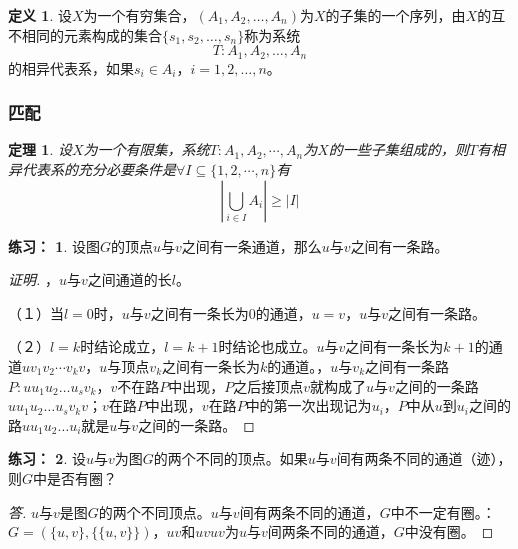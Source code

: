 \documentclass{beamer}
\newtheorem{Thm}{定理}[section]
\theoremstyle{definition}
\newtheorem{Def}{定义}[section]
\theoremstyle{example}
\newtheorem*{Exercise}{练习：}
\begin{document}
\begin{CJK}{UTF8}{gbsn}
\begin{frame}
  \begin{Def}
    设$X$为一个有穷集合，$(A_1,A_2,\ldots,A_n)$为$X$的子集的一个序列，由$X$的互不相同的元素构成的集合$\{s_1,s_2,\ldots,s_n\}$称为系统\[T:A_1,A_2,\ldots,A_n\]的\alert{相异代表系}，如果$s_i\in A_i$，$i=1,2,\ldots,n$。
  \end{Def}

\end{frame}
\begin{frame}
  \frametitle{匹配}
    \begin{Thm}
    设$X$为一个有限集，系统$T:A_1,A_2,\cdots,A_n$为$X$的一些子集组成的，则$T$有相异代表系的充分必要条件是$\forall I \subseteq \{1,2,\cdots, n\}$有
    \[|\bigcup_{i\in I}A_i|\geq |I|\]
  \end{Thm}
\end{frame}


\begin{frame}
  \begin{Exercise}
  设图$G$的顶点$u$与$v$之间有一条通道，那么$u$与$v$之间有一条路。
\end{Exercise}
\pause
\begin{proof}[证明]\justifying\let\raggedright\justifying
{}，$u$与$v$之间通道的长$l$。

  \pause（１）当$l=0$时，$u$与$v$之间有一条长为$0$的通道，$u=v$，$u$与$v$之间有一条路。

  \pause （２）$l=k$时结论成立，$l=k+1$时结论也成立。$u$与$v$之间有一条长为$k+1$的通道$uv_1v_2\cdots v_kv$，$u$与顶点$v_k$之间有一条长为$k$的通道。，\pause$u$与$v_k$之间有一条路$P:uu_1u_2\ldots u_sv_k$，$v$不在路$P$中出现，$P$之后接顶点$v$就构成了$u$与$v$之间的一条路$uu_1u_2\ldots u_sv_kv$；$v$在路$P$中出现，$v$在路$P$中的第一次出现记为$u_i$，$P$中从$u$到$u_i$之间的路$uu_1u_2\ldots u_i$就是$u$与$v$之间的一条路。
\end{proof}

\end{frame}

\begin{frame}
  \begin{Exercise}
      设$u$与$v$为图$G$的两个不同的顶点。如果$u$与$v$间有两条不同的通道（迹），则$G$中是否有圈？
    \end{Exercise}
    \pause\begin{proof}[答]\justifying\let\raggedright\justifying
  $u$与$v$是图$G$的两个不同顶点。$u$与$v$间有两条不同的通道，$G$中不一定有圈。：$G=(\{u,v\},\{\{u,v\}\})$，$uv$和$uvuv$为$u$与$v$间两条不同的通道，$G$中没有圈。


\end{proof}
\end{frame}
\end{CJK}
\end{document}
